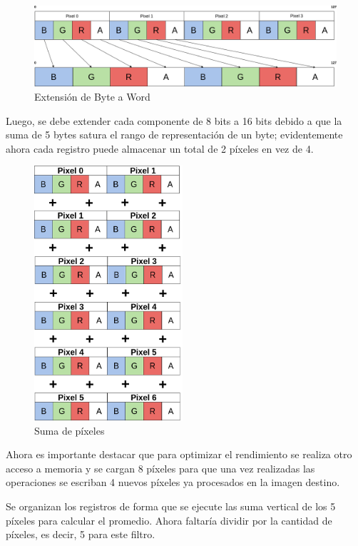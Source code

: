 \documentclass[a4paper]{article}
\begin{document}
 \begin{figure}[h!]
   \begin{center}
 	\includegraphics[scale=0.33]{images/filtro-ZigZag-1.jpg}
 	\caption{Extensión de Byte a Word}
 	\label{nombreparareferenciar}
   \end{center}
\end{figure}

Luego, se debe extender cada componente de 8 bits a 16 bits  debido a que la suma de 5 bytes  satura el rango de representación de un byte; evidentemente ahora cada registro puede almacenar un total de 2 píxeles en vez de 4.

\begin{figure}
\includegraphics[width=5.5cm]{images/filtro-ZigZag-2.jpg}
\centering
\caption{Suma de píxeles}
\end{figure}
\par

Ahora es importante destacar que para optimizar el rendimiento se realiza otro acceso a memoria y se cargan 8 píxeles para que una vez realizadas las operaciones se escriban 4 nuevos píxeles ya procesados en la imagen destino.

Se organizan los registros de forma que se ejecute las suma vertical de los 5 píxeles para calcular el promedio. Ahora faltaría dividir por la cantidad de píxeles, es decir, 5 para este filtro.
\end{document}
